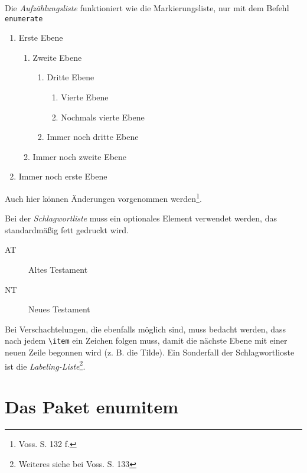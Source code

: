 Die \emph{Aufzählungsliste} funktioniert wie die Markierungsliste, nur mit dem Befehl \verb+enumerate+
\begin{enumerate}
	\item Erste Ebene
	\begin{enumerate}
		\item Zweite Ebene
		\begin{enumerate}
			\item Dritte Ebene
			\begin{enumerate}
				\item Vierte Ebene
				\item Nochmals vierte Ebene
			\end{enumerate}
			\item Immer noch dritte Ebene
		\end{enumerate}
		\item Immer noch zweite Ebene
	\end{enumerate}
	\item Immer noch erste Ebene
\end{enumerate}
Auch hier können Änderungen vorgenommen werden\footnote{Voss. S. 132 f.}.

Bei der \emph{Schlagwortliste} muss ein optionales Element verwendet werden, das standardmäßig fett gedruckt wird.
\begin{description}
	\item[AT] Altes Testament
	\item[NT] Neues Testament
\end{description}
Bei Verschachtelungen, die ebenfalls möglich sind, muss bedacht werden, dass nach jedem \verb*+\item+ ein Zeichen folgen muss, damit die nächste Ebene mit einer neuen Zeile begonnen wird (z. B. die Tilde). Ein Sonderfall der Schlagwortlioste ist die \emph{Labeling-Liste}\footnote{Weiteres siehe bei Voss. S. 133}.

\section{Das Paket enumitem}


